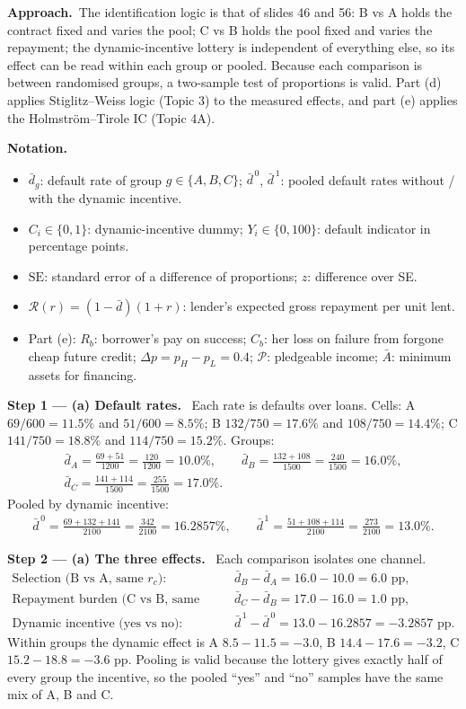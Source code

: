 \documentclass[11pt,a4paper]{article}
\newcommand{\notation}{\par\noindent\textbf{Notation.}}
\newcommand{\step}[2]{\par\medskip\noindent\textbf{Step #1 --- #2.}~}
\newcommand{\approach}{\par\smallskip\noindent\textbf{Approach.}~}
\begin{document}
\approach The identification logic is that of slides 46 and 56: B vs A holds the contract fixed and varies the
pool; C vs B holds the pool fixed and varies the repayment; the dynamic-incentive lottery is independent of
everything else, so its effect can be read within each group or pooled. Because each comparison is between
randomised groups, a two-sample test of proportions is valid. Part (d) applies Stiglitz--Weiss logic (Topic 3)
to the measured effects, and part (e) applies the Holmström--Tirole IC (Topic 4A).

\notation
\begin{itemize}
  \item $\bar d_g$: default rate of group $g\in\{A,B,C\}$; $\bar d^{\,0}$, $\bar d^{\,1}$: pooled default rates without / with the dynamic incentive.
  \item $C_i\in\{0,1\}$: dynamic-incentive dummy; $Y_i\in\{0,100\}$: default indicator in percentage points.
  \item $\text{SE}$: standard error of a difference of proportions; $z$: difference over SE.
  \item $\mathcal R(r)=(1-\bar d)(1+r)$: lender's expected gross repayment per unit lent.
  \item Part (e): $R_b$: borrower's pay on success; $C_b$: her loss on failure from forgone cheap future credit;
        $\Delta p=p_H-p_L=0.4$; $\mathcal P$: pledgeable income; $\bar A$: minimum assets for financing.
\end{itemize}

\step{1}{(a) Default rates} Each rate is defaults over loans. Cells: A $69/600=11.5\%$ and $51/600=8.5\%$;
B $132/750=17.6\%$ and $108/750=14.4\%$; C $141/750=18.8\%$ and $114/750=15.2\%$. Groups:
\begin{align}
  \bar d_A=\frac{69+51}{1200}=\frac{120}{1200}=10.0\%,\qquad \bar d_B=\frac{132+108}{1500}=\frac{240}{1500}=16.0\%, \nonumber\\
  \bar d_C=\frac{141+114}{1500}=\frac{255}{1500}=17.0\%. \nonumber
\end{align}
Pooled by dynamic incentive:
\begin{align}
  \bar d^{\,0}=\frac{69+132+141}{2100}=\frac{342}{2100}=16.2857\%,\qquad \bar d^{\,1}=\frac{51+108+114}{2100}=\frac{273}{2100}=13.0\%. \nonumber
\end{align}

\step{2}{(a) The three effects} Each comparison isolates one channel.
\begin{align}
  \text{Selection (B vs A, same } r_c\text{):}&\quad \bar d_B-\bar d_A = 16.0-10.0 = 6.0 \text{ pp}, \label{t4e19-sel}\\
  \text{Repayment burden (C vs B, same pool):}&\quad \bar d_C-\bar d_B = 17.0-16.0 = 1.0 \text{ pp}, \label{t4e19-bur}\\
  \text{Dynamic incentive (yes vs no):}&\quad \bar d^{\,1}-\bar d^{\,0} = 13.0-16.2857 = -3.2857 \text{ pp}. \label{t4e19-dyn}
\end{align}
Within groups the dynamic effect is A $8.5-11.5=-3.0$, B $14.4-17.6=-3.2$, C $15.2-18.8=-3.6$ pp. Pooling is
valid because the lottery gives exactly half of every group the incentive, so the pooled ``yes'' and ``no''
samples have the same mix of A, B and C.
\end{document}
